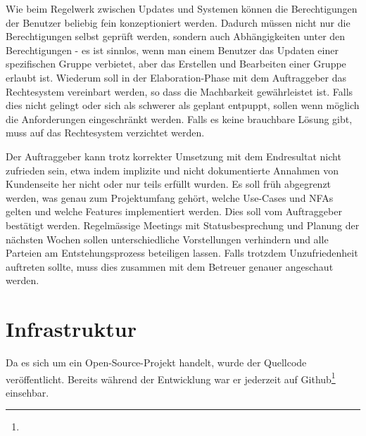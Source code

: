 {Wie beim Regelwerk zwischen Updates und Systemen können die Berechtigungen der Benutzer beliebig fein konzeptioniert werden. Dadurch müssen nicht nur die Berechtigungen selbst geprüft werden, sondern auch Abhängigkeiten unter den Berechtigungen - es ist sinnlos, wenn man einem Benutzer das Updaten einer spezifischen Gruppe verbietet, aber das Erstellen und Bearbeiten einer Gruppe erlaubt ist.}
{Wiederum soll in der Elaboration-Phase mit dem Auftraggeber das Rechtesystem vereinbart werden, so dass die Machbarkeit gewährleistet ist. Falls dies nicht gelingt oder sich als schwerer als geplant entpuppt, sollen wenn möglich die Anforderungen eingeschränkt werden. Falls es keine brauchbare Lösung gibt, muss auf das Rechtesystem verzichtet werden.}


{Der Auftraggeber kann trotz korrekter Umsetzung mit dem Endresultat nicht zufrieden sein, etwa indem implizite und nicht dokumentierte Annahmen von Kundenseite her nicht oder nur teils erfüllt wurden.}
{Es soll früh abgegrenzt werden, was genau zum Projektumfang gehört, welche Use-Cases und NFAs gelten und welche Features implementiert werden. Dies soll vom Auftraggeber bestätigt werden. Regelmässige Meetings mit Statusbesprechung und Planung der nächsten Wochen sollen unterschiedliche Vorstellungen verhindern und alle Parteien am Entstehungsprozess beteiligen lassen. Falls trotzdem Unzufriedenheit auftreten sollte, muss dies zusammen mit dem Betreuer genauer angeschaut werden.}


\section{Infrastruktur}

Da es sich um ein Open-Source-Projekt handelt, wurde der Quellcode veröffentlicht. Bereits während der Entwicklung war er jederzeit auf Github\footnote{} einsehbar.


